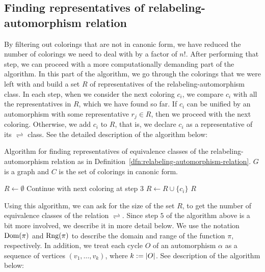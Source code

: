 \subsection{Finding representatives of relabeling-automorphism relation}

By filtering out colorings that are not in canonic form, we have reduced the number of colorings we need to deal with by a factor of $n!$. After performing that step, we can proceed with a more computationally demanding part of the algorithm. In this part of the algorithm, we go through the colorings that we were left with and build a set $R$ of representatives of the relabeling-automorphism class. In each step, when we consider the next coloring $c_i$, we compare $c_i$ with all the representatives in $R$, which we have found so far. If $c_i$ can be unified by an automorphism with some representative $r_j \in R$, then we proceed with the next coloring. Otherwise, we add $c_i$ to $R$, that is, we declare $c_i$ as a representative of its $\rightleftharpoons$ class. See the detailed description of the algorithm below:

\begin{algorithm}[H]
    \caption{Algorithm for finding representatives of equivalence classes of the relabeling-automorphism relation as in Definition~\ref{dfn:relabeling-automorphism-relation}. $G$ is a graph and $C$ is the set of colorings in canonic form.} 
    \begin{algorithmic}[1]
            \State $R \gets \emptyset$
                        \State Continue with next coloring at step 3
                    \EndIf
                \EndFor
                \State $R \gets R \cup \{c_i\}$
            \EndFor
            \State \Return $R$
        \EndFunction
    \end{algorithmic}
    \label{alg:representatives-of-relabeling-automorphism-relation}
\end{algorithm}

Using this algorithm, we can ask for the size of the set $R$, to get the number of equivalence classes of the relation $\rightleftharpoons$. Since step $5$ of the algorithm above is a bit more involved, we describe it in more detail below. We use the notation $\operatorname{Dom}(\pi)$ and $\operatorname{Rng}(\pi)$ to describe the domain and range of the function $\pi$, respectively. In addition, we treat each cycle $O$ of an automorphism $\alpha$ as a sequence of vertices $(v_1,\ldots,v_k)$, where $k := \left|{O}\right|$. See description of the algorithm below:

